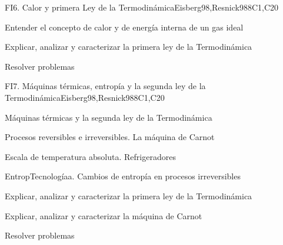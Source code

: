 \begin{syllabus}
\begin{unit}{FI6. Calor y primera Ley de la Termodinámica}{}{Eisberg98,Resnick98}{8}{C1,C20}
   \begin{learningoutcomes}
         \item  Entender el concepto de calor y de energía interna de un gas ideal
         \item  Explicar, analizar y caracterizar la primera ley de la Termodinámica
         \item  Resolver problemas
   \end{learningoutcomes}
\end{unit}

\begin{unit}{FI7. Máquinas térmicas, entropía y la segunda ley de la Termodinámica}{}{Eisberg98,Resnick98}{8}{C1,C20}
\begin{topics}
         \item  Máquinas térmicas y la segunda ley de la Termodinámica
	 \item  Procesos reversibles e irreversibles. La máquina de Carnot
         \item  Escala de temperatura absoluta. Refrigeradores
	 \item  EntropTecnologíaa. Cambios de entropía en procesos irreversibles
   \end{topics}

   \begin{learningoutcomes}
         \item  Explicar, analizar y caracterizar la primera ley de la Termodinámica
         \item  Explicar, analizar y caracterizar la máquina de Carnot
         \item  Resolver problemas
   \end{learningoutcomes}
\end{unit}

\begin{coursebibliography}
\end{coursebibliography}

\end{syllabus}

%

